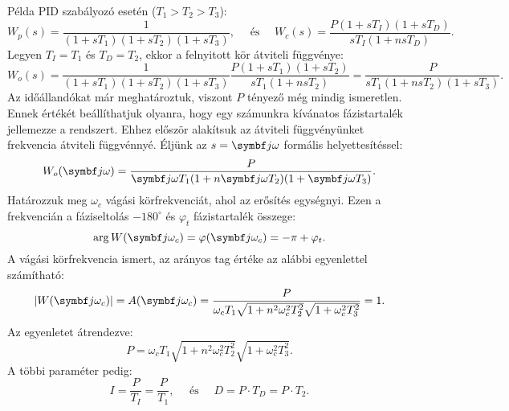 Példa PID szabályozó esetén ($T_1 > T_2 > T_3$):
\begin{equation}
  W_p(s) = \frac{1}{(1 + sT_1)(1 + sT_2)(1 + sT_3)},
  \quad \text{ és } \quad
  W_c(s) = \frac{P (1 + sT_I)(1 + sT_D)}{sT_I(1 + nsT_D)}
  .
\end{equation}
Legyen $T_I = T_1$ és $T_D = T_2$, ekkor a felnyitott kör átviteli függvénye:
\begin{equation}
  W_o(s)
  = \frac{1}{(1 + sT_1)(1 + sT_2)(1 + sT_3)}
  \frac{P(1 + sT_1)(1 + sT_2)}{sT_1(1 + nsT_2)}
  = \frac{P}{sT_1(1 + nsT_2)(1 + sT_3)}
  .
\end{equation}
Az időállandókat már meghatároztuk, viszont $P$ tényező még mindig ismeretlen.
Ennek értékét beállíthatjuk olyanra, hogy egy számunkra kívánatos
fázistartalék jellemezze a rendszert. Ehhez először alakítsuk az átviteli
függvényünket frekvencia átviteli függvénnyé. Éljünk az $s = \iu \omega$
formális helyettesítéssel:
\begin{equation}
  W_o(\iu \omega)
  = \frac{P}{\iu \omega T_1(1 + n \iu \omega T_2)(1 + \iu \omega T_3)}
  .
  \label{eq:PID-iuw}
\end{equation}
Határozzuk meg $\omega_c$ vágási körfrekvenciát, ahol az erősítés egységnyi.
Ezen a frekvencián a fáziseltolás $-180^\circ$ és $\varphi_t$ fázistartalék
összege:
\begin{equation}
  \arg W(\iu \omega_c)
  = \varphi(\iu \omega_c)
  = -\pi + \varphi_t
  .
  \label{eq:PID-phi}
\end{equation}
A vágási körfrekvencia ismert, az arányos tag értéke az alábbi egyenlettel
számítható:
\begin{equation}
  \abs{W(\iu \omega_c)}
  = A(\iu \omega_c)
  = \frac{P}{
    \omega_c T_1
    \sqrt{1 + n^2 \omega_c^2 T_2^2}
    \sqrt{1 + \omega_c^2 T_3^2}
  } = 1
  .
  \label{eq:PID-A}
\end{equation}
Az egyenletet átrendezve:
\begin{equation}
  P = \omega_c T_1 \sqrt{1 + n^2 \omega_c^2 T_2^2} \sqrt{1 + \omega_c^2 T_3^2}
  .
  \label{eq:PID-P}
\end{equation}
A többi paraméter pedig:
\begin{equation}
  I = \frac{P}{T_I} = \frac{P}{T_1}
  ,\quad \text{ és } \quad
  D = P \cdot T_D = P \cdot T_2
  .
  \label{eq:PID-TD}
\end{equation}
